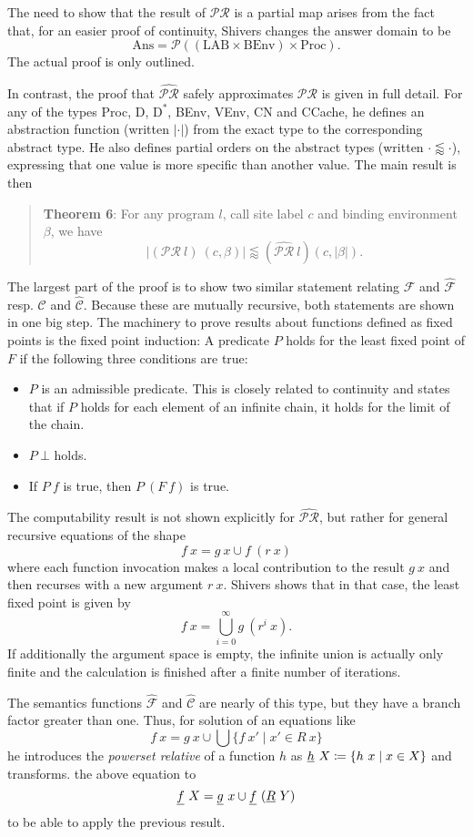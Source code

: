 \documentclass[a4paper,halfparskip,DIV=10,11pt]{scrbook}
\newcommand{\C}{\mathcal C}
\newcommand{\F}{\mathcal F}
\newcommand{\PR}{\mathcal {PR}}
\newcommand{\aC}{\widehat{\mathcal C}}
\newcommand{\aF}{\widehat{\mathcal F}}
\newcommand{\aPR}{\widehat{\mathcal {PR}}}
\begin{document}
The need to show that the result of $\PR$ is a partial map arises from the fact that, for an easier proof of continuity, Shivers changes the answer domain to be
\[
\text{Ans} = \mathcal P( (\text{LAB}\times\text{BEnv}) \times \text{Proc}).
\]
The actual proof is only outlined.

In contrast, the proof that $\aPR$ safely approximates $\PR$ is given in full detail. For any of the types Proc, D, $\text{D}^*$, BEnv, VEnv, CN and CCache, he defines an abstraction function (written $|\cdot|$) from the exact type to the corresponding abstract type. He also defines partial orders on the abstract types (written $\cdot \lessapprox \cdot$), expressing that one value is more specific than another value. The main result is then
\begin{quote}
\textbf{Theorem 6}: For any program $l$, call site label $c$ and binding environment $\beta$, we have
\[
|(\PR\ l)\ (c,\beta)| \lessapprox (\aPR\ l) (c,|\beta|).
\]
\end{quote}
The largest part of the proof is to show two similar statement relating $\F$ and $\aF$ resp. $\C$ and $\aC$. Because these are mutually recursive, both statements are shown in one big step. The machinery to prove results about functions defined as fixed points is the fixed point induction: A predicate $P$ holds for the least fixed point of $F$ if the following three conditions are true:\label{fixedpointinduction}
\begin{itemize}
\item $P$ is an admissible predicate. This is closely related to continuity and states that if $P$ holds for each element of an infinite chain, it holds for the limit of the chain.
\item $P\ \bot$ holds.
\item If $P\ f$ is true, then $P\ (F\ f)$ is true.
\end{itemize}

\label{shiverscomputabilty}The computability result is not shown explicitly for $\aPR$, but rather for general recursive equations of the shape
\[
f\ x = g\ x \cup f\ (r\ x)
\]
where each function invocation makes a local contribution to the result $g\ x$ and then recurses with a new argument $r\ x$. Shivers shows that in that case, the least fixed point is given by
\[
f\ x = \bigcup_{i=0}^\infty g\ (r^i\ x).
\]
If additionally the argument space is empty, the infinite union is actually only finite and the calculation is finished after a finite number of iterations.

The semantics functions $\aF$ and $\aC$ are nearly of this type, but they have a branch factor greater than one. Thus, for solution of an equations like
\[
f\ x = g\ x \cup \bigcup\{f\ x' \mid x' \in R\ x\}
\]
he introduces the \textit{powerset relative} of a function $h$ as $\uline h\ X\coloneqq \{h\ x \mid x\in X\}$ and transforms. the above equation to 
\[
\uline f\ X = \uline g\ x \cup \uline f\ (\uline R\ Y)
\]
to be able to apply the previous result.
\end{document}
